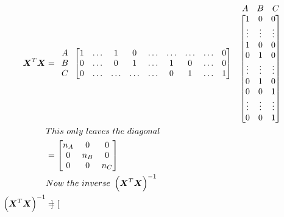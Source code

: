 \documentclass[12pt]{article}
\begin{document}
\begin{enumerate}
\begin{align*}
    \Xt \X &= \begin{array}{c c c} 
        A \\
        B \\
        C 
    \end{array} \begin{bmatrix}
        1 & \ldots & 1 & 0 & \ldots & \ldots & \ldots & \ldots & 0 \\
        0 & \ldots & 0 & 1 & \ldots & 1 & 0 & \ldots & 0 \\
        0 & \ldots & \ldots & \ldots & \ldots & 0 & 1 & \ldots & 1
    \end{bmatrix}\begin{array}{c c}
        \begin{array}{c c c}
            A & B & C \\
        \end{array} \\
        \begin{bmatrix}
            1 & 0 & 0 \\
            \vdots & \vdots & \vdots \\
            1 & 0 & 0 \\
            0 & 1 & 0 \\
            \vdots & \vdots & \vdots \\
            0 & 1 & 0 \\
            0 & 0 & 1 \\
            \vdots & \vdots & \vdots \\
            0 & 0 & 1
        \end{bmatrix}
    \end{array} \\
    &This\ only\ leaves\ the\ diagonal\\
    &= \begin{bmatrix}
        n_A & 0 & 0 \\
        0 & n_B & 0 \\
        0 & 0 & n_C
    \end{bmatrix} \\
    &Now\ the\ inverse\ 
    \XtXinv \\
    \XtXinv &= \begin{bmatrix}

\end{bmatrix}
\end{align*}
\end{enumerate}
\end{document}
